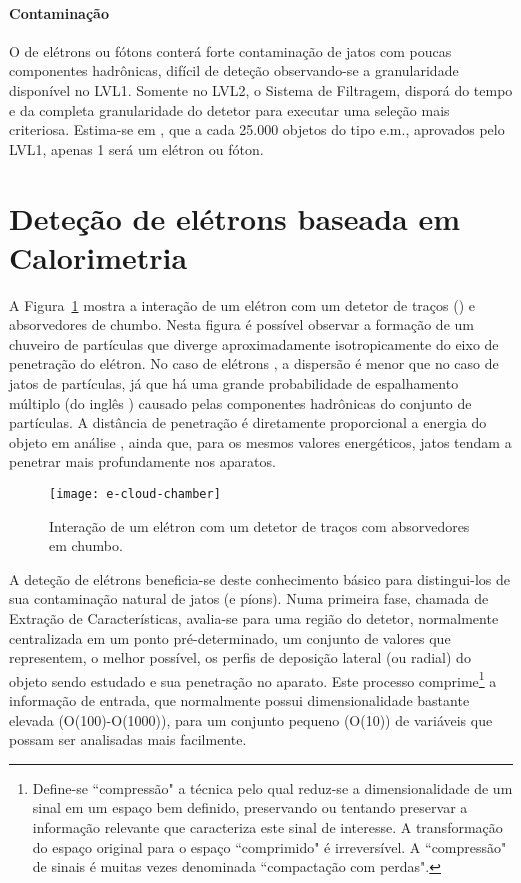 \paragraph{Contaminação} O  de elétrons ou fótons conterá forte
contaminação de jatos com poucas componentes hadrônicas, difícil de deteção
observando-se a granularidade disponível no LVL1. Somente no LVL2, o Sistema
de Filtragem, disporá do tempo e da completa granularidade do detetor para
executar uma seleção mais criteriosa. Estima-se em \cite{daqnote00-02}, que a
cada 25.000 objetos do tipo e.m., aprovados pelo LVL1, apenas 1 será um
elétron ou fóton.

\section{Deteção de elétrons baseada em Calorimetria}
\label{sec:e-detection}

A Figura~\ref{fig:e-shower} mostra a interação de um elétron com um detetor de
traços () e absorvedores de chumbo. Nesta figura é
possível observar a formação de um chuveiro de partículas que diverge
aproximadamente isotropicamente do eixo de penetração do elétron. No caso de
elétrons \cite{wigmans-book}, a dispersão é menor que no caso de jatos de
partículas, já que há uma grande probabilidade de espalhamento múltiplo (do
inglês ) causado pelas componentes hadrônicas do
conjunto de partículas. A distância de penetração é diretamente proporcional a
energia do objeto em análise \cite{leo, knoll}, ainda que, para os mesmos
valores energéticos, jatos tendam a penetrar mais profundamente nos aparatos.

\begin{figure}
\begin{center}
\texttt{[image: e-cloud-chamber]}
\end{center}
\caption{Interação de um elétron com um detetor de traços com absorvedores em
chumbo.} 
\label{fig:e-shower}
\end{figure}


A deteção de elétrons beneficia-se deste conhecimento básico para
distingui-los de sua contaminação natural de jatos (e píons). Numa primeira
fase, chamada de Extração de Características, avalia-se para uma região do
detetor, normalmente centralizada em um ponto pré-determinado, um conjunto de
valores que representem, o melhor possível, os perfis de deposição lateral (ou
radial) do objeto sendo estudado e sua penetração no aparato. Este processo
comprime\footnote{Define-se ``compressão" a técnica pelo qual reduz-se a
dimensionalidade de um sinal em um espaço bem definido, preservando ou
tentando preservar a informação relevante que caracteriza este sinal de
interesse. A transformação do espaço original para o espaço ``comprimido" é
irreversível. A ``compressão" de sinais é muitas vezes denominada
``compactação com perdas".} a informação de entrada, que normalmente possui
dimensionalidade bastante elevada (O(100)-O(1000)), para um conjunto pequeno
(O(10)) de variáveis que possam ser analisadas mais facilmente.

